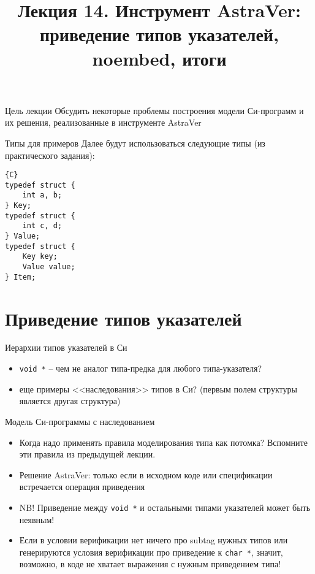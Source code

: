 \documentclass[hyperref={unicode=true}]{beamer}
\title{Лекция 14. Инструмент AstraVer: приведение
типов указателей, noembed, итоги}
\author{}
\date{}
\begin{document}
	\begin{frame}{}
		\titlepage
	\end{frame}

    \begin{frame}{Цель лекции}
    Обсудить некоторые проблемы построения модели
    Си-программ и их решения, реализованные
    в инструменте AstraVer
    \end{frame}

    \begin{frame}[fragile]{Типы для примеров}
    Далее будут использоваться следующие типы (из
    практического задания):
    \begin{lstlisting}{C}
typedef struct {
    int a, b;
} Key;
typedef struct {
    int c, d;
} Value;
typedef struct {
    Key key;
    Value value;
} Item;
    \end{lstlisting}
    \end{frame}

    \section{Приведение типов указателей}

    \begin{frame}{Иерархии типов указателей в Си}
    \begin{itemize}
    \item \texttt{void *} -- чем не аналог типа-предка
    для любого типа-указателя?
    \item еще примеры <<наследования>> типов в Си?
    (первым полем структуры является другая структура)
    \end{itemize}
    \end{frame}

    \begin{frame}{Модель Си-программы с наследованием}
    \begin{itemize}
    \item
    Когда надо применять правила моделирования типа
    как потомка?
    Вспомните эти правила из предыдущей лекции.
    \item
    Решение AstraVer: только если в исходном коде или
    спецификации встречается операция приведения
    \item
    NB! Приведение между \texttt{void *} и остальными
    типами указателей может быть неявным!
    \item
    Если в условии верификации нет ничего про subtag
    нужных типов или генерируются условия верификации
    про приведение к \texttt{char *}, значит, возможно,
    в коде не хватает выражения с нужным приведением типа!
    \end{itemize}
    \end{frame}
\end{document}
